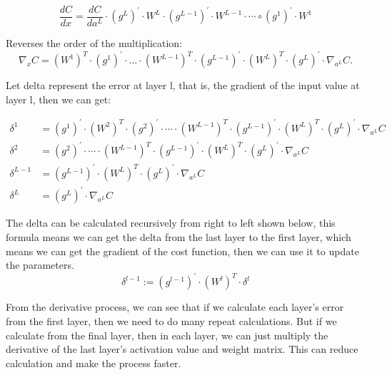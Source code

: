 \documentclass{article}
\begin{document}
    \begin{equation}
    \frac{d C}{d x} = \frac{d C}{d a^L} \cdot \left(g^L\right)^{\prime} \cdot W^L \cdot \left(g^{L-1}\right)^{\prime} \cdot W^{L-1} \cdot \cdots \circ\left(g^1\right)^{\prime} \cdot W^1
    \end{equation}

    Reverses the order of the multiplication:
\begin{equation}
\nabla_x C=\left(W^1\right)^T \cdot\left(g^1\right)^{\prime}\cdot \ldots \cdot\left(W^{L-1}\right)^T \cdot\left(g^{L-1}\right)^{\prime} \cdot\left(W^L\right)^T \cdot\left(g^L\right)^{\prime} \cdot \nabla_{a^L} C.
\end{equation}

Let delta represent the error at layer l, that is, the gradient of the input value at layer l, then we can get:

\begin{equation}
\begin{aligned} \delta^1 & =\left(g^1\right)^{\prime} \cdot\left(W^2\right)^T \cdot\left(g^2\right)^{\prime} \cdot \cdots \cdot \left(W^{L-1}\right)^T \cdot\left(g^{L-1}\right)^{\prime} \cdot \left(W^L\right)^T \cdot\left(g^L\right)^{\prime} \cdot \nabla_{a^L} C \\ \delta^2 & =\left(g^2\right)^{\prime} \cdot \cdots \cdot \left(W^{L-1}\right)^T \cdot\left(g^{L-1}\right)^{\prime} \cdot \left(W^L\right)^T \cdot\left(g^L\right)^{\prime} \cdot \nabla_{a^L} C\\ \delta^{L-1} & =\left(g^{L-1}\right)^{\prime} \cdot \left(W^L\right)^T \cdot\left(g^L\right)^{\prime} \cdot \nabla_{a^L} C \\ \delta^L & =\left(g^L\right)^{\prime} \cdot \nabla_{a^L} C \end{aligned}
\end{equation}

The delta can be calculated recursively from right to left shown below, this formula means we can get the delta from the last layer to the first layer, which means we can get the gradient of the cost function, then we can use it to update the parameters.
\begin{equation}
\delta^{l-1}:=\left(g^{l-1}\right)^{\prime} \cdot \left(W^l\right)^T \cdot \delta^l
\end{equation}

From the derivative process, we can see that if we calculate each layer's error from the first layer, then we need to do many repeat calculations. But if we calculate from the final layer, then in each layer, we can just multiply the derivative of the last layer's activation value and weight matrix. This can reduce calculation and make the process faster.
\end{document}
